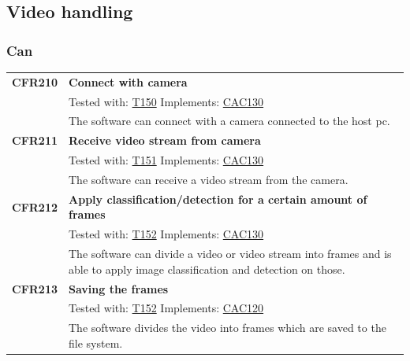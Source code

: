 \documentclass[parskip=full]{scrartcl}
\begin{document}
\subsection{Video handling}
\subsubsection{Can}
\begin{tabular}{p{2cm}p{11.4cm}}
\textbf{CFR210} \hypertarget{CFR150} & \textbf{Connect with camera}\\
& Tested with: \hyperlink{T150}{T150} Implements: \hyperlink{CAC130}{CAC130} \\
& The software can connect with a camera connected to the \gls{host pc}.\\
\textbf{CFR211} \hypertarget{CFR151} & \textbf{Receive video stream from camera}\\
& Tested with: \hyperlink{T151}{T151} Implements: \hyperlink{CAC130}{CAC130}\\
& The software can receive a video stream from the camera.\\
\textbf{CFR212} \hypertarget{CFR152} & \textbf{Apply classification/detection for a certain amount of frames}\\
& Tested with: \hyperlink{T152}{T152} Implements: \hyperlink{CAC130}{CAC130}\\
& The software can divide a video or video stream into frames and is able to apply \gls{image classification} and detection on those.\\
\textbf{CFR213} \hypertarget{CFR153} & \textbf{Saving the frames}\\
& Tested with: \hyperlink{T152}{T152} Implements: \hyperlink{CAC120}{CAC120}\\
& The software divides the video into frames which are saved to the file system.
\end{tabular}
\end{document}
